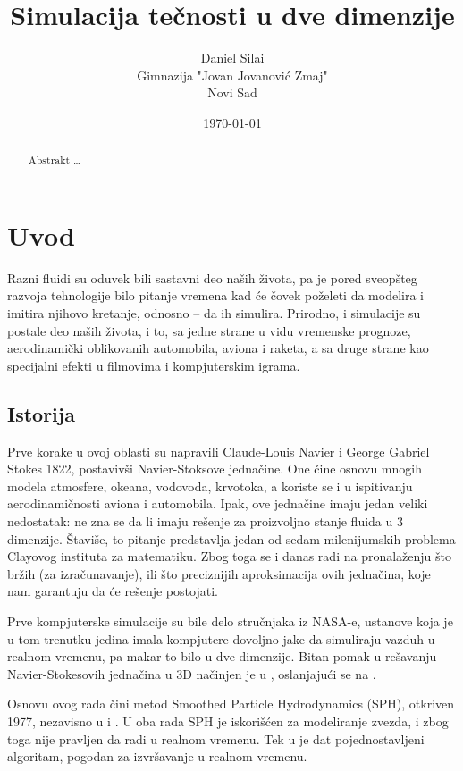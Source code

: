 \documentclass[12pt]{article}
\title{Simulacija te\v cnosti u dve dimenzije}
\author{
        Daniel Sila\dj i \\
        Gimnazija "Jovan Jovanovi\'{c} Zmaj"\\
		Novi Sad
}
\date{\today}
\begin{document}
\maketitle

\begin{abstract}
Abstrakt \ldots
\end{abstract}

\section{Uvod}\label{uvod}
    Razni fluidi su oduvek bili sastavni deo na\v sih \v zivota, pa je pored sveop\v steg razvoja tehnologije bilo pitanje vremena kad \'ce \v covek po\v zeleti da modelira i imitira njihovo kretanje, odnosno -- da ih simulira. Prirodno, i simulacije su postale deo na\v sih \v zivota, i to, sa jedne strane u vidu vremenske prognoze, aerodinami\v cki oblikovanih automobila, aviona i raketa, a sa druge strane kao specijalni efekti u filmovima i kompjuterskim igrama.

    \subsection{Istorija}\label{istorija}
        Prve korake u ovoj oblasti su napravili Claude-Louis Navier i George Gabriel Stokes 1822, postaviv\v si Navier-Stoksove jedna\v cine.
        One \v cine osnovu mnogih modela atmosfere, okeana, vodovoda, krvotoka, a koriste se i u ispitivanju aerodinami\v cnosti aviona i automobila. Ipak, ove jedna\v cine imaju jedan veliki nedostatak: ne zna se da li imaju re\v senje za proizvoljno stanje fluida u 3 dimenzije. \v Stavi\v se, to pitanje predstavlja jedan od sedam milenijumskih problema Clayovog instituta za matematiku. Zbog toga se i danas radi na pronala\v zenju \v sto br\v zih (za izra\v cunavanje), ili \v sto preciznijih aproksimacija ovih jedna\v cina, koje nam garantuju da \'ce re\v senje postojati.

        Prve kompjuterske simulacije su bile delo stru\v cnjaka iz NASA-e, ustanove koja je u tom trenutku jedina imala kompjutere dovoljno jake da simuliraju vazduh u realnom vremenu, pa makar to bilo u dve dimenzije. Bitan pomak u re\v savanju Navier-Stokesovih jedna\v cina u 3D na\v cinjen je u \cite{Foster:1996:RAL:244304.244315}, oslanjaju\'ci se na \cite{harlow:2182}.

        Osnovu ovog rada \v cini metod Smoothed Particle Hydrodynamics (SPH), otkriven 1977, nezavisno u \cite{1977MNRAS.181..375G} i \cite{1977AJ.....82.1013L}. U oba rada SPH je iskori\v s\'cen za modeliranje zvezda, i zbog toga nije pravljen da radi u realnom vremenu. Tek u \cite{Muller:2003:PFS:846276.846298} je dat pojednostavljeni algoritam, pogodan za izvr\v savanje u realnom vremenu.
\end{document}
